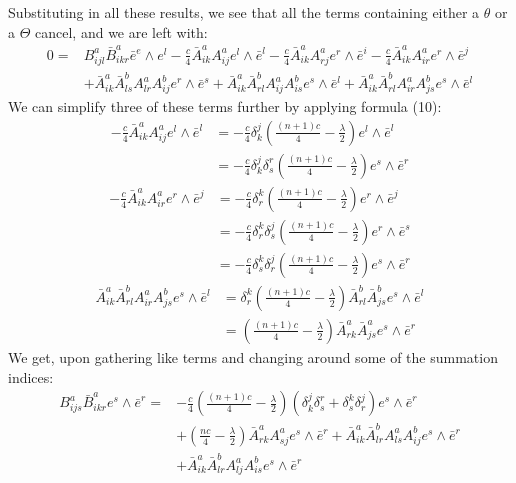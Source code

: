 Substituting in all these results, we see that all the terms containing either a $\theta$ or a $\Theta$ cancel, and we are left with:
%
\begin{align*}
0 =& B^a_{ijl} \bar{B}^a_{ikr} \bar{e}^e \wedge e^l - \frac{c}{4} \bar{A}^a_{ik} A^a_{ij} e^l \wedge \bar{e}^l - \frac{c}{4} \bar{A}^a_{ik} A^a_{rj} e^r \wedge \bar{e}^i - \frac{c}{4} \bar{A}^a_{ik} A^a_{ir} e^r \wedge \bar{e}^j \\
&+ \bar{A}^a_{ik} \bar{A}^b_{ls} A^a_{lr} A^b_{ij} e^r \wedge \bar{e}^s + \bar{A}^a_{ik} \bar{A}^b_{rl} A^a_{ij} A^b_{is}  e^s \wedge \bar{e}^l +
\bar{A}^a_{ik} \bar{A}^b_{rl} A^a_{ir} A^b_{js} e^s \wedge \bar{e}^l
\end{align*}
%
We can simplify three of these terms further by applying formula (10):
%
\begin{align*}
 - \frac{c}{4} \bar{A}^a_{ik} A^a_{ij} e^l \wedge \bar{e}^l &= - \frac{c}{4} \delta^j_k \left( \frac{(n+1)c}{4} - \frac{\lambda}{2} \right) e^l \wedge \bar{e}^l \\
&= - \frac{c}{4} \delta^j_k \delta^r_s \left( \frac{(n+1)c}{4} - \frac{\lambda}{2} \right) e^s \wedge \bar{e}^r
\end{align*}
%
\begin{align*}
- \frac{c}{4} \bar{A}^a_{ik} A^a_{ir} e^r \wedge \bar{e}^j &= - \frac{c}{4} \delta^k_r \left( \frac{(n+1)c}{4} - \frac{\lambda}{2} \right) e^r \wedge \bar{e}^j \\
&= - \frac{c}{4} \delta^k_r \delta^j_s \left( \frac{(n+1)c}{4} - \frac{\lambda}{2} \right) e^r \wedge \bar{e}^s \\
&= - \frac{c}{4} \delta^k_s \delta^j_r \left( \frac{(n+1)c}{4} - \frac{\lambda}{2} \right) e^s \wedge \bar{e}^r
\end{align*} 
%
\begin{align*}
\bar{A}^a_{ik} \bar{A}^b_{rl} A^a_{ir} A^b_{js} e^s \wedge \bar{e}^l  &= \delta^k_r \left( \frac{(n+1)c}{4} - \frac{\lambda}{2} \right)  \bar{A}^b_{rl} \bar{A}^b_{js} e^s \wedge \bar{e}^l \\
&= \left( \frac{(n+1)c}{4} - \frac{\lambda}{2} \right)  \bar{A}^a_{rk} \bar{A}^a_{js} e^s \wedge \bar{e}^r
\end{align*}
%
We get, upon gathering like terms and changing around some of the summation indices:
%
\begin{align*}
B^a_{ijs} \bar{B}^a_{ikr} e^s \wedge \bar{e}^r =& - \frac{c}{4} \left( \frac{(n+1)c}{4} - \frac{\lambda}{2} \right) \left( \delta^j_k \delta^r_s + \delta^k_s \delta^j_r \right) e^s \wedge \bar{e}^r \\
&+ \left( \frac{nc}{4} - \frac{\lambda}{2} \right) \bar{A}^a_{rk} A^a_{sj} e^s \wedge \bar{e}^r + \bar{A}^a_{ik} \bar{A}^b_{lr} A^a_{ls} A^b_{ij} e^s \wedge \bar{e}^r \\
&+ \bar{A}^a_{ik} \bar{A}^b_{lr} A^a_{lj} A^b_{is} e^s \wedge \bar{e}^r
\end{align*}
